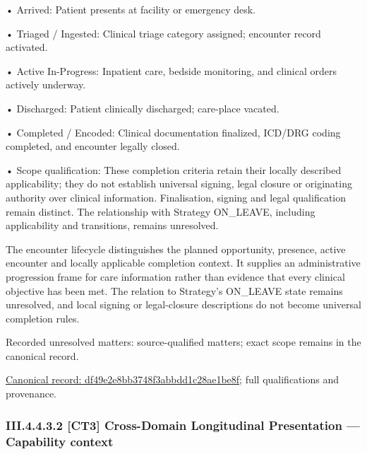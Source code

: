 •
Arrived: Patient presents at facility or emergency desk.



•
Triaged / Ingested: Clinical triage category assigned; encounter record activated.



•
Active In-Progress: Inpatient care, bedside monitoring, and clinical orders actively underway.



•
Discharged: Patient clinically discharged; care-place vacated.



•
Completed / Encoded: Clinical documentation finalized, ICD/DRG coding completed, and encounter legally closed.



•
Scope qualification: These completion criteria retain their locally described applicability; they do not establish universal signing, legal closure or originating authority over clinical information. Finalisation, signing and legal qualification remain distinct. The relationship with Strategy ON\_LEAVE, including applicability and transitions, remains unresolved.



The encounter lifecycle distinguishes the planned opportunity, presence, active encounter and locally applicable completion context. It supplies an administrative progression frame for care information rather than evidence that every clinical objective has been met. The relation to Strategy's ON\_LEAVE state remains unresolved, and local signing or legal-closure descriptions do not become universal completion rules.


{\small Recorded unresolved matters: source-qualified matters; exact scope remains in the canonical record.}\par
{\footnotesize \href{../../../../../../../../continuum/business/business-process/df49e2e8bb3748f3abbdd1c28ae1be8f.md}{Canonical record: df49e2e8bb3748f3abbdd1c28ae1be8f}; full qualifications and provenance.}\par
\subsubsection*{III.4.4.3.2 [CT3] Cross-Domain Longitudinal Presentation — Capability context}
\label{navigation:III.4.4.3.2}

